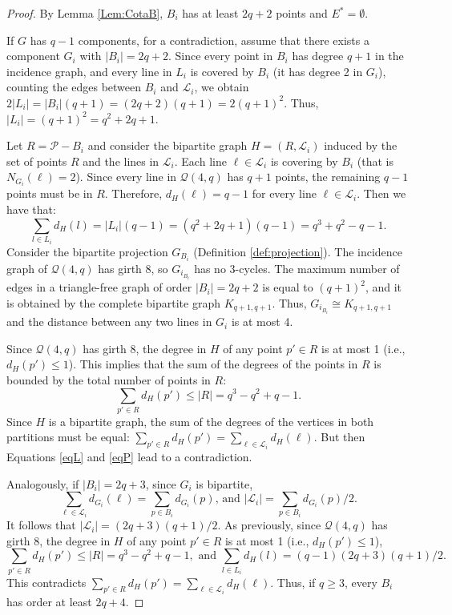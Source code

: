 \documentclass[12pt]{article}
\begin{document}
\begin{proof}
     By Lemma \ref{Lem:CotaB}, $B_i$ has at least $2q+2$ points and $E^*=\emptyset$.
     
     If $G$ has $q-1$ components, for a contradiction, assume that there exists a component $G_i$ with $|B_i| = 2q + 2$. 
    Since every point in $B_i$ has degree $q+1$ in the incidence graph, and every line in $L_i$ is covered by $B_i$ (it has degree 2 in $G_i$), counting the edges between $B_i$ and $\mathcal{L}_i$, we obtain $2|L_i| = |B_i|(q+1) = (2q+2)(q+1) = 2(q+1)^2$. Thus, $|L_i| = (q+1)^2 = q^2 + 2q + 1$.
    
Let $R=\mathcal{P}-B_i$ and consider the bipartite graph $H = (R, \mathcal{L}_i)$ induced by the set of points $R$ and the lines in $\mathcal{L}_i$. 
Each line $\ell \in \mathcal{L}_i$ is covering by $B_i$ (that is $N_{G_i}(\ell)=2$). Since every line in $\mathcal{Q}(4,q)$ has $q+1$ points, the remaining $q-1$ points must be in $R$. Therefore, $d_H(\ell) = q - 1$ for every line $\ell \in \mathcal{L}_i$. Then we have that:  
\begin{equation}\label{eqL}
 \sum_{l \in L_i} d_H(l) = |L_i|(q - 1) = (q^2 + 2q + 1)(q - 1) = q^3 + q^2 - q - 1.
\end{equation}
Consider the bipartite projection $G_{B_i}$ (Definition \ref{def:projection}). The incidence graph of $\mathcal{Q}(4,q)$ has girth 8, so $G_{i_{B_i}}$ has no 3-cycles. The maximum number of edges in a triangle-free graph of order $|B_i|=2q+2$ is equal to $(q+1)^2$, and it is obtained by the complete bipartite graph $K_{q+1,q+1}$. Thus, $G_{i_{B_i}}\cong K_{q+1,q+1}$ and the distance between any two lines in $G_i$ is at most 4. 

Since $\mathcal{Q}(4,q)$ has girth 8, the degree in $H$ of any point $p' \in R$ is at most 1 (i.e., $d_H(p') \le 1$). This implies that the sum of the degrees of the points in $R$ is bounded by the total number of points in $R$:
\begin{equation}\label{eqP}
    \sum_{p' \in R} d_H(p') \le |R|  = q^3 - q^2 + q - 1. 
\end{equation}
Since $H$ is a bipartite graph, the sum of the degrees of the vertices in both partitions must be equal:
$\sum_{p' \in R} d_H(p') = \sum_{\ell \in \mathcal{L}_i} d_H(\ell)$. But then Equations \ref{eqL} and \ref{eqP} lead to a contradiction.

Analogously, if $|B_i|=2q+3$, since $G_i$ is bipartite,  $$\sum_{\ell\in\mathcal{L}_i} d_{G_i}(\ell)= \sum_{p\in B_i} d_{G_i}(p) \mbox{, and } |\mathcal{L}_i|=\sum_{p\in B_i} d_{G_i}(p)/2.$$ 
It follows that $|\mathcal{L}_i|=(2q+3)(q+1)/2$.
As previously, since $\mathcal{Q}(4,q)$ has girth 8, the degree in $H$ of any point $p' \in R$ is at most 1 (i.e., $d_H(p') \le 1$),
$$ \sum_{p' \in R} d_H(p') \le |R|  = q^3 - q^2 + q - 1,\text{ and }
\sum_{l \in L_i} d_H(l) = (q - 1)(2q+3)(q+1)/2.$$
This contradicts $ \sum_{p' \in R} d_H(p') = \sum_{\ell \in \mathcal{L}_i} d_H(\ell) $.
Thus, if $q\ge3$, every $B_i$ has order at least $2q+4$.
\end{proof}
\end{document}
